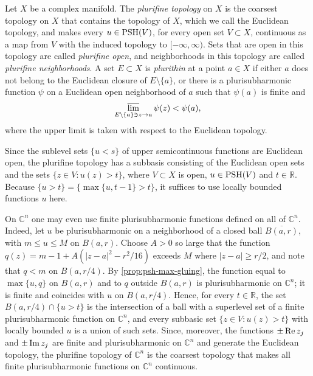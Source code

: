 \begin{definition}\label{def:plurifine-topology}
Let $X$ be a complex manifold. The \emph{plurifine topology} on $X$ is the coarsest topology on $X$ that contains the topology of $X$, which we call the Euclidean topology, and makes every $u\in\mathrm{PSH}(V)$, for every open set $V\subset X$, continuous as a map from $V$ with the induced topology to $[-\infty,\infty)$. Sets that are open in this topology are called \emph{plurifine open}, and neighborhoods in this topology are called \emph{plurifine neighborhoods}. A set $E\subset X$ is \emph{plurithin} at a point $a\in X$ if either $a$ does not belong to the Euclidean closure of $E\setminus\{a\}$, or there is a plurisubharmonic function $\psi$ on a Euclidean open neighborhood of $a$ such that $\psi(a)$ is finite and
\[
 \varlimsup_{E\setminus\{a\}\ni z\to a}\psi(z)<\psi(a),
\]
where the upper limit is taken with respect to the Euclidean topology.
\end{definition}

Since the sublevel sets $\{u<s\}$ of upper semicontinuous functions are Euclidean open, the plurifine topology has a subbasis consisting of the Euclidean open sets and the sets $\{z\in V:u(z)>t\}$, where $V\subset X$ is open, $u\in\mathrm{PSH}(V)$ and $t\in\mathbb R$. Because $\{u>t\}=\{\max\{u,t-1\}>t\}$, it suffices to use locally bounded functions $u$ here.

On $\mathbb C^n$ one may even use finite plurisubharmonic functions defined on all of $\mathbb C^n$. Indeed, let $u$ be plurisubharmonic on a neighborhood of a closed ball $\overline{B(a,r)}$, with $m\le u\le M$ on $B(a,r)$. Choose $A>0$ so large that the function $q(z)=m-1+A(|z-a|^2-r^2/16)$ exceeds $M$ where $|z-a|\ge r/2$, and note that $q<m$ on $B(a,r/4)$. By \cref{prop:psh-max-gluing}, the function equal to $\max\{u,q\}$ on $B(a,r)$ and to $q$ outside $B(a,r)$ is plurisubharmonic on $\mathbb C^n$; it is finite and coincides with $u$ on $B(a,r/4)$. Hence, for every $t\in\mathbb R$, the set $B(a,r/4)\cap\{u>t\}$ is the intersection of a ball with a superlevel set of a finite plurisubharmonic function on $\mathbb C^n$, and every subbasic set $\{z\in V:u(z)>t\}$ with locally bounded $u$ is a union of such sets. Since, moreover, the functions $\pm\operatorname{Re} z_j$ and $\pm\operatorname{Im} z_j$ are finite and plurisubharmonic on $\mathbb C^n$ and generate the Euclidean topology, the plurifine topology of $\mathbb C^n$ is the coarsest topology that makes all finite plurisubharmonic functions on $\mathbb C^n$ continuous.

